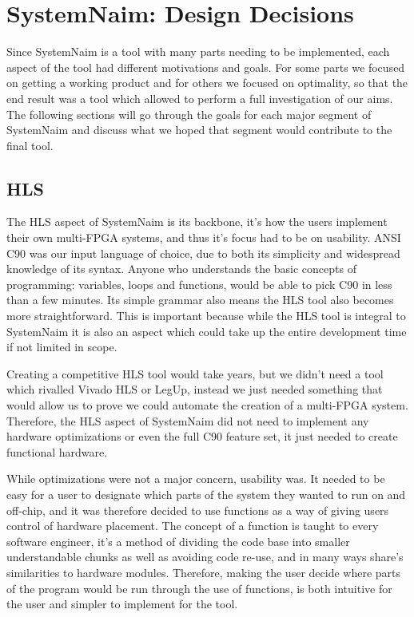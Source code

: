 \chapter{SystemNaim: Design Decisions}

Since SystemNaim is a tool with many parts needing to be implemented, each aspect of the tool had different motivations and goals. For some parts we focused on getting a working product and for others we focused on optimality, so that the end result was a tool which allowed to perform a full investigation of our aims. The following sections will go through the goals for each major segment of SystemNaim and discuss what we hoped that segment would contribute to the final tool.

\section{HLS}
\label{sec:hls_design}

The HLS aspect of SystemNaim is its backbone, it's how the users implement their own multi-FPGA systems, and thus it's focus had to be on usability. ANSI C90 was our input language of choice, due to both its simplicity and widespread knowledge of its syntax. Anyone who understands the basic concepts of programming: variables, loops and functions, would be able to pick C90 in less than a few minutes. Its simple grammar also means the HLS tool also becomes more straightforward. This is important because while the HLS tool is integral to SystemNaim it is also an aspect which could take up the entire development time if not limited in scope. 

Creating a competitive HLS tool would take years, but we didn't need a tool which rivalled Vivado HLS or LegUp, instead we just needed something that would allow us to prove we could automate the creation of a multi-FPGA system. Therefore, the HLS aspect of SystemNaim did not need to implement any hardware optimizations or even the full C90 feature set, it just needed to create functional hardware.

While optimizations were not a major concern, usability was. It needed to be easy for a user to designate which parts of the system they wanted to run on and off-chip, and it was therefore decided to use functions as a way of giving users control of hardware placement. The concept of a function is taught to every software engineer, it's a method of dividing the code base into smaller understandable chunks as well as avoiding code re-use, and in many ways share's similarities to hardware modules. Therefore, making the user decide where parts of the program would be run through the use of functions, is both intuitive for the user and simpler to implement for the tool. 

